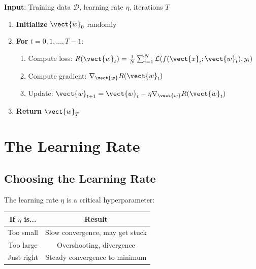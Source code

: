 \begin{tcolorbox}[title=Gradient Descent Algorithm]
\textbf{Input}: Training data $\mathcal{D}$, learning rate $\eta$, iterations $T$

\begin{enumerate}
    \item \textbf{Initialize} $\vect{w}_0$ randomly
    \item \textbf{For} $t = 0, 1, \ldots, T-1$:
    \begin{enumerate}
        \item Compute loss: $R(\vect{w}_t) = \frac{1}{N} \sum_{i=1}^{N} \mathcal{L}(f(\vect{x}_i; \vect{w}_t), y_i)$
        \item Compute gradient: $\nabla_{\vect{w}} R(\vect{w}_t)$
        \item Update: $\vect{w}_{t+1} = \vect{w}_t - \eta \nabla_{\vect{w}} R(\vect{w}_t)$
    \end{enumerate}
    \item \textbf{Return} $\vect{w}_T$
\end{enumerate}
\end{tcolorbox}


\section{The Learning Rate}

\subsection{Choosing the Learning Rate}

The learning rate $\eta$ is a critical hyperparameter:

\begin{center}
\begin{tabular}{|c|c|}
\hline
\textbf{If $\eta$ is...} & \textbf{Result} \\ \hline
Too small & Slow convergence, may get stuck \\ \hline
Too large & Overshooting, divergence \\ \hline
Just right & Steady convergence to minimum \\ \hline
\end{tabular}
\end{center}

